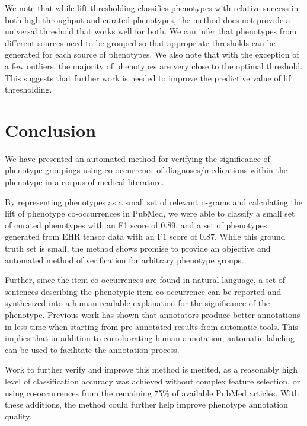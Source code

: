 \documentclass{sig-alternate-05-2015}
\begin{document}
We note that while lift thresholding classifies phenotypes with relative success in both high-throughput and curated phenotypes, the method does not provide a universal threshold that works well for both. We can infer that phenotypes from different sources need to be grouped so that appropriate thresholds can be generated for each source of phenotypes. We also note that with the exception of a few outliers, the majority of phenotypes are very close to the optimal threshold. This suggests that further work is needed to improve the predictive value of lift thresholding.

\section{Conclusion}
We have presented an automated method for verifying the significance of phenotype groupings using co-occurrence of diagnoses/medications within the phenotype in a corpus of medical literature. 

By representing phenotypes as a small set of relevant n-grams and calculating the lift of phenotype co-occurrences in PubMed, we were able to classify a small set of curated phenotypes with an F1 score of 0.89, and a set of phenotypes generated from EHR tensor data with an F1 score of 0.87. While this ground truth set is small, the method shows promise to provide an objective and automated method of verification for arbitrary phenotype groups. 

Further, since the item co-occurrences are found in natural language, a set of sentences describing the phenotypic item co-occurrence can be reported and synthesized into a human readable explanation for the significance of the phenotype. Previous work \cite{neveol2011semi} has shown that annotators produce better annotations in less time when starting from pre-annotated results from automatic tools. This implies that in addition to corroborating human annotation, automatic labeling can be used to facilitate the annotation process. 

Work to further verify and improve this method is merited, as a reasonably high level of classification accuracy was achieved without complex feature selection, or using co-occurrences from the remaining 75\% of available PubMed articles. With these additions, the method could further help improve phenotype annotation quality. 



%
%
%


\end{document}
